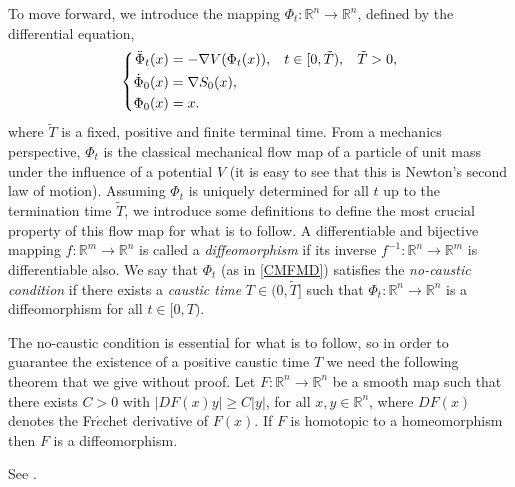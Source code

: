 \documentclass[a4paper,12pt,draft]{report}
\begin{document}
To move forward, we introduce the mapping $\Phi_t :\mathbb{R}^n \to \mathbb{R}^n$, defined by the differential equation,
\begin{equation}
\left\{
\begin{aligned}
\ddot{\Phi}_t(x) & = -\nabla V(\Phi_t(x)), \hspace{0.3cm} t \in [0, \tilde{T}), \hspace{0.3cm} \tilde{T} > 0,\\ \label{CMFMD}
\dot{\Phi}_0(x) & = \nabla S_0(x), \\
\Phi_0(x) & = x.
\end{aligned}
\right.
\end{equation}
where $\tilde{T}$ is a fixed, positive and finite terminal time.  From a mechanics perspective, $\Phi_t$ is the classical mechanical flow map of a particle of unit mass under the influence of a potential $V$ (it is easy to see that this is Newton's second law of motion).  Assuming $\Phi_t$ is uniquely determined for all $t$ up to the termination time $\tilde{T}$, we introduce some definitions to define the most crucial property of this flow map for what is to follow.
{
A differentiable and bijective mapping $f :\mathbb{R}^m \to \mathbb{R}^n$ is called a \emph{diffeomorphism} if its inverse $f^{-1}:\mathbb{R}^n \to \mathbb{R}^m$ is differentiable also.
}
{
We say that $\Phi_t$ (as in \eqref{CMFMD}) satisfies the \emph{no-caustic condition} if there exists a \emph{caustic time} $T \in (0, \tilde{T}]$ such that $\Phi_t :\mathbb{R}^n \to \mathbb{R}^n$ is a diffeomorphism for all $t \in [0, T)$.
}

The no-caustic condition is essential for what is to follow, so in order to guarantee the existence of a positive caustic time $T$ we need the following theorem that we give without proof.
\theorem
{
Let $F :\mathbb{R}^n \to \mathbb{R}^n$ be a smooth map such that there exists $C > 0$ with $|DF(x)y| \ge C|y|$, for all $x, y \in \mathbb{R}^n$, where $DF(x)$ denotes the Fr$\acute{e}$chet derivative of $F(x)$.  If $F$ is homotopic to a homeomorphism then $F$ is a diffeomorphism.
}
\proof
{
See \cite{SEF2}.

\qedhere
}
\end{document}
